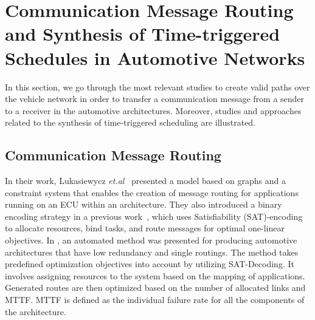 \section{Communication Message Routing and Synthesis of Time-triggered Schedules in Automotive Networks}
  In this section, we go through the most relevant studies to create valid paths over the vehicle network in order to transfer a communication message from a sender to a receiver in the automotive architectures. Moreover, studies and approaches related to the synthesis of time-triggered scheduling are illustrated.
  \subsection{Communication Message Routing}\label{messagerouting_relatedwork}
  In their work, Lukasiewycz \emph{et.al}~\cite{lukasiewycz2014system} presented a model based on graphs and a constraint system that enables the creation of message routing for applications running on an ECU within an architecture. They also introduced a binary encoding strategy in a previous work~\cite{lukasiewycz2009combined}, which uses Satisfiability (SAT)-encoding to allocate resources, bind tasks, and route messages for optimal one-linear objectives. 
  In \cite{smirnov2018automatic}, an automated method was presented for producing automotive architectures that have low redundancy and single routings. The method takes predefined optimization objectives into account by utilizing SAT-Decoding. It involves assigning resources to the system based on the mapping of applications. Generated routes are then optimized based on the number of allocated links and MTTF. MTTF is defined as the individual failure rate for all the components of the architecture. 
  
